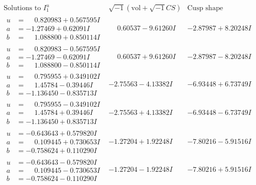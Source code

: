 \documentclass[1p]{elsarticle_modified}
\theoremstyle{definition}
\newcommand{\I}{\sqrt{-1}}
\begin{document}
$$\begin{array}{c|c|c}  
\text{Solutions to }I^u_{1}& \I (\text{vol} + \sqrt{-1}CS) & \text{Cusp shape}\\
 \hline 
\begin{aligned}
u &= \phantom{-}0.820983 + 0.567595 I \\
a &= -1.27469 + 0.62091 I \\
b &= \phantom{-}1.088800 + 0.850114 I\end{aligned}
 & \phantom{-}0.60537 - 9.61260 I & -2.87987 + 8.20248 I \\ \hline\begin{aligned}
u &= \phantom{-}0.820983 - 0.567595 I \\
a &= -1.27469 - 0.62091 I \\
b &= \phantom{-}1.088800 - 0.850114 I\end{aligned}
 & \phantom{-}0.60537 + 9.61260 I & -2.87987 - 8.20248 I \\ \hline\begin{aligned}
u &= \phantom{-}0.795955 + 0.349102 I \\
a &= \phantom{-}1.45784 - 0.39446 I \\
b &= -1.136450 - 0.835713 I\end{aligned}
 & -2.75563 - 4.13382 I & -6.93448 + 6.73749 I \\ \hline\begin{aligned}
u &= \phantom{-}0.795955 - 0.349102 I \\
a &= \phantom{-}1.45784 + 0.39446 I \\
b &= -1.136450 + 0.835713 I\end{aligned}
 & -2.75563 + 4.13382 I & -6.93448 - 6.73749 I \\ \hline\begin{aligned}
u &= -0.643643 + 0.579820 I \\
a &= \phantom{-}0.109445 + 0.730653 I \\
b &= -0.758624 + 0.110290 I\end{aligned}
 & -1.27204 + 1.92248 I & -7.80216 - 5.91516 I \\ \hline\begin{aligned}
u &= -0.643643 - 0.579820 I \\
a &= \phantom{-}0.109445 - 0.730653 I \\
b &= -0.758624 - 0.110290 I\end{aligned}
 & -1.27204 - 1.92248 I & -7.80216 + 5.91516 I \\ \hline\begin{aligned}

\end{aligned}
\end{array}$$
\end{document}

